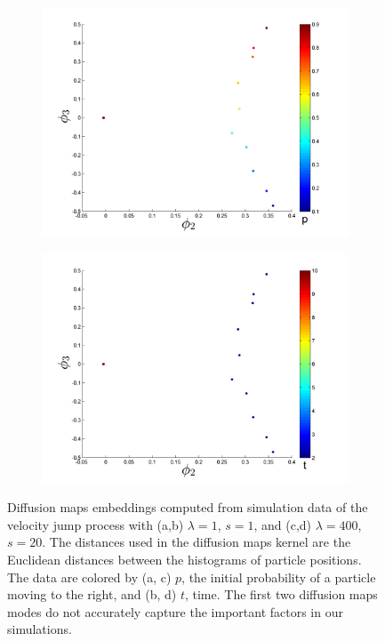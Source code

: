 \documentclass[prl, reprint, final, showkeys]{revtex4-1}
\begin{document}
\begin{figure}[t]
\begin{subfigure}{0.2\textwidth}
\includegraphics[width=\textwidth]{rawhist_p_400}
\caption{}
\end{subfigure}
\begin{subfigure}{0.2\textwidth}
\includegraphics[width=\textwidth]{rawhist_t_400}
\caption{}
\end{subfigure}
\caption{Diffusion maps embeddings computed from simulation data of the velocity jump process with (a,b) $\lambda=1$, $s=1$, and (c,d) $\lambda=400$, $s=20$. The distances used in the diffusion maps kernel are the Euclidean distances between the histograms of particle positions. The data are colored by (a, c) $p$, the initial probability of a particle moving to the right, and (b, d) $t$, time. The first two diffusion maps modes do not accurately capture the important factors in our simulations.}
\label{fig:dmaps_embed_noemd}
\end{figure}
\end{document}
